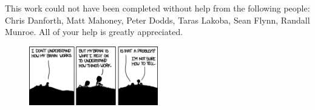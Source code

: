 This work could not have been completed without help from the following people: Chris Danforth, Matt Mahoney, Peter Dodds, Taras Lakoba, Sean Flynn, Randall Munroe.
All of your help is greatly appreciated.

\begin{figure}[ht]
  \centering
  \includegraphics[width=0.5\textwidth]{figure/xkcd}
  \label{fig:xkcd}
\end{figure}

